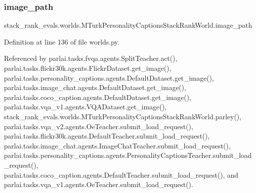 \mbox{\label{classstack__rank__evals_1_1worlds_1_1MTurkPersonalityCaptionsStackRankWorld_a661ad47f448ac14939018d6d164a1e9b}} 
\subsubsection{\texorpdfstring{image\+\_\+path}{image\_path}}
{\footnotesize\ttfamily stack\+\_\+rank\+\_\+evals.\+worlds.\+M\+Turk\+Personality\+Captions\+Stack\+Rank\+World.\+image\+\_\+path}



Definition at line 136 of file worlds.\+py.



Referenced by parlai.\+tasks.\+fvqa.\+agents.\+Split\+Teacher.\+act(), parlai.\+tasks.\+flickr30k.\+agents.\+Flickr\+Dataset.\+get\+\_\+image(), parlai.\+tasks.\+personality\+\_\+captions.\+agents.\+Default\+Dataset.\+get\+\_\+image(), parlai.\+tasks.\+image\+\_\+chat.\+agents.\+Default\+Dataset.\+get\+\_\+image(), parlai.\+tasks.\+coco\+\_\+caption.\+agents.\+Default\+Dataset.\+get\+\_\+image(), parlai.\+tasks.\+vqa\+\_\+v1.\+agents.\+V\+Q\+A\+Dataset.\+get\+\_\+image(), stack\+\_\+rank\+\_\+evals.\+worlds.\+M\+Turk\+Personality\+Captions\+Stack\+Rank\+World.\+parley(), parlai.\+tasks.\+vqa\+\_\+v2.\+agents.\+Oe\+Teacher.\+submit\+\_\+load\+\_\+request(), parlai.\+tasks.\+flickr30k.\+agents.\+Default\+Teacher.\+submit\+\_\+load\+\_\+request(), parlai.\+tasks.\+image\+\_\+chat.\+agents.\+Image\+Chat\+Teacher.\+submit\+\_\+load\+\_\+request(), parlai.\+tasks.\+personality\+\_\+captions.\+agents.\+Personality\+Captions\+Teacher.\+submit\+\_\+load\+\_\+request(), parlai.\+tasks.\+coco\+\_\+caption.\+agents.\+Default\+Teacher.\+submit\+\_\+load\+\_\+request(), and parlai.\+tasks.\+vqa\+\_\+v1.\+agents.\+Oe\+Teacher.\+submit\+\_\+load\+\_\+request().

\mbox{\label{classstack__rank__evals_1_1worlds_1_1MTurkPersonalityCaptionsStackRankWorld_a81f83b129eedcba3368cb1e134b10e26}} 
